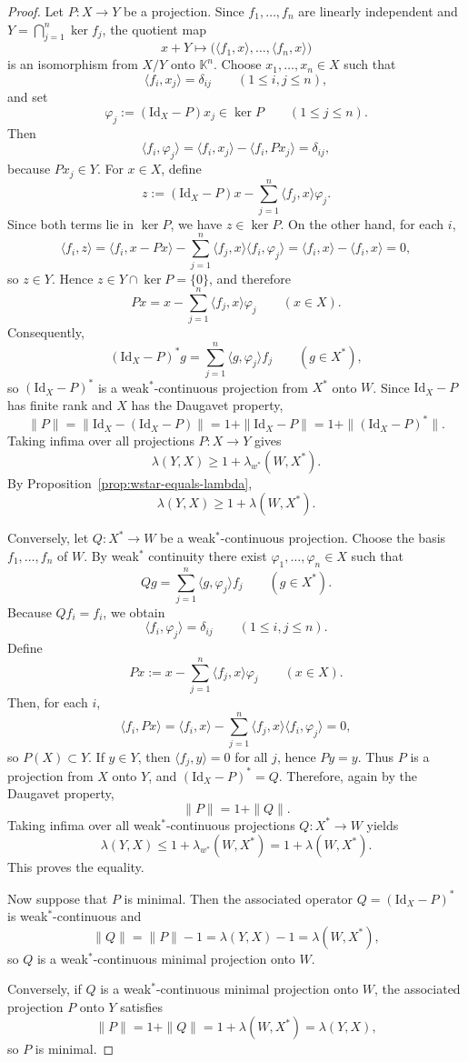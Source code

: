 \documentclass[11pt]{amsart}
\numberwithin{equation}{section}
\theoremstyle{definition}
\theoremstyle{remark}
\newcommand{\K}{\mathbb K}
\newcommand{\Id}{\mathrm{Id}}
\newcommand{\wstar}{w^*}
\begin{document}
\begin{proof}
Let $P\colon X\to Y$ be a projection. Since $f_1,\dots,f_n$ are linearly independent and $Y=\bigcap_{j=1}^n\ker f_j$, the quotient map
\[
x+Y\longmapsto \bigl(\langle f_1,x\rangle,\dots,\langle f_n,x\rangle\bigr)
\]
is an isomorphism from $X/Y$ onto $\K^n$. Choose $x_1,\dots,x_n\in X$ such that
\[
\langle f_i,x_j\rangle=\delta_{ij}
\qquad (1\leqslant i,j\leqslant n),
\]
and set
\[
\varphi_j:=(\Id_X-P)x_j \in \ker P
\qquad (1\leqslant j\leqslant n).
\]
Then
\[
\langle f_i,\varphi_j\rangle
=
\langle f_i,x_j\rangle-\langle f_i,Px_j\rangle
=
\delta_{ij},
\]
because $Px_j\in Y$. For $x\in X$, define
\[
z:=(\Id_X-P)x-\sum_{j=1}^n \langle f_j,x\rangle\varphi_j.
\]
Since both terms lie in $\ker P$, we have $z\in\ker P$. On the other hand, for each $i$,
\[
\langle f_i,z\rangle
=
\langle f_i,x-Px\rangle
-
\sum_{j=1}^n \langle f_j,x\rangle\langle f_i,\varphi_j\rangle
=
\langle f_i,x\rangle-\langle f_i,x\rangle
=
0,
\]
so $z\in Y$. Hence $z\in Y\cap\ker P=\{0\}$, and therefore
\[
Px=x-\sum_{j=1}^n \langle f_j,x\rangle\varphi_j
\qquad (x\in X).
\]
Consequently,
\[
(\Id_X-P)^*g = \sum_{j=1}^n \langle g,\varphi_j\rangle f_j
\qquad (g\in X^*),
\]
so $(\Id_X-P)^*$ is a weak$^*$-continuous projection from $X^*$ onto $W$. Since $\Id_X-P$ has finite rank and $X$ has the Daugavet property,
\[
\|P\| = \|\Id_X-(\Id_X-P)\| = 1+\|\Id_X-P\| = 1+\|(\Id_X-P)^*\|.
\]
Taking infima over all projections $P\colon X\to Y$ gives
\[
\lambda(Y,X)\geqslant 1+\lambda_{\wstar}(W,X^*).
\]
By Proposition~\ref{prop:wstar-equals-lambda},
\[
\lambda(Y,X)\geqslant 1+\lambda(W,X^*).
\]

Conversely, let $Q\colon X^*\to W$ be a weak$^*$-continuous projection. Choose the basis $f_1,\dots,f_n$ of $W$. By weak$^*$ continuity there exist $\varphi_1,\dots,\varphi_n\in X$ such that
\[
Qg = \sum_{j=1}^n \langle g,\varphi_j\rangle f_j
\qquad (g\in X^*).
\]
Because $Qf_i=f_i$, we obtain
\[
\langle f_i,\varphi_j\rangle = \delta_{ij}
\qquad (1\leqslant i,j\leqslant n).
\]
Define
\[
Px := x - \sum_{j=1}^n \langle f_j,x\rangle\varphi_j
\qquad (x\in X).
\]
Then, for each $i$,
\[
\langle f_i,Px\rangle
=
\langle f_i,x\rangle
-
\sum_{j=1}^n \langle f_j,x\rangle\langle f_i,\varphi_j\rangle
=
0,
\]
so $P(X)\subset Y$. If $y\in Y$, then $\langle f_j,y\rangle=0$ for all $j$, hence $Py=y$. Thus $P$ is a projection from $X$ onto $Y$, and $(\Id_X-P)^*=Q$. Therefore, again by the Daugavet property,
\[
\|P\| = 1+\|Q\|.
\]
Taking infima over all weak$^*$-continuous projections $Q\colon X^*\to W$ yields
\[
\lambda(Y,X)\leqslant 1+\lambda_{\wstar}(W,X^*) = 1+\lambda(W,X^*).
\]
This proves the equality.

Now suppose that $P$ is minimal. Then the associated operator $Q=(\Id_X-P)^*$ is weak$^*$-continuous and
\[
\|Q\| = \|P\|-1 = \lambda(Y,X)-1 = \lambda(W,X^*),
\]
so $Q$ is a weak$^*$-continuous minimal projection onto $W$.

Conversely, if $Q$ is a weak$^*$-continuous minimal projection onto $W$, the associated projection $P$ onto $Y$ satisfies
\[
\|P\| = 1+\|Q\| = 1+\lambda(W,X^*) = \lambda(Y,X),
\]
so $P$ is minimal.
\end{proof}
\end{document}
